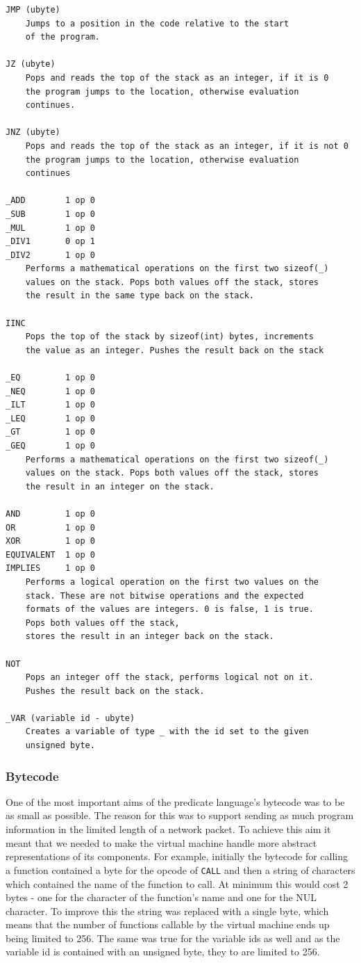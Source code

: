 \begin{verbatim}
JMP (ubyte)
    Jumps to a position in the code relative to the start
    of the program.

JZ (ubyte)
    Pops and reads the top of the stack as an integer, if it is 0
    the program jumps to the location, otherwise evaluation
    continues.

JNZ (ubyte)
    Pops and reads the top of the stack as an integer, if it is not 0
    the program jumps to the location, otherwise evaluation
    continues

_ADD        1 op 0
_SUB        1 op 0
_MUL        1 op 0
_DIV1       0 op 1
_DIV2       1 op 0
    Performs a mathematical operations on the first two sizeof(_)
    values on the stack. Pops both values off the stack, stores
    the result in the same type back on the stack.

IINC
    Pops the top of the stack by sizeof(int) bytes, increments
    the value as an integer. Pushes the result back on the stack

_EQ	        1 op 0
_NEQ        1 op 0
_ILT        1 op 0
_LEQ        1 op 0
_GT	        1 op 0
_GEQ        1 op 0
    Performs a mathematical operations on the first two sizeof(_)
    values on the stack. Pops both values off the stack, stores
    the result in an integer on the stack.

AND         1 op 0
OR          1 op 0
XOR	        1 op 0
EQUIVALENT  1 op 0
IMPLIES     1 op 0
    Performs a logical operation on the first two values on the
    stack. These are not bitwise operations and the expected
    formats of the values are integers. 0 is false, 1 is true.
    Pops both values off the stack,
    stores the result in an integer back on the stack.

NOT
    Pops an integer off the stack, performs logical not on it.
    Pushes the result back on the stack.
	
_VAR (variable id - ubyte)
    Creates a variable of type _ with the id set to the given
    unsigned byte.
\end{verbatim}


\subsubsection{Bytecode}

One of the most important aims of the predicate language's bytecode was to be as small as possible. The reason for this was to support sending as much program information in the limited length of a network packet. To achieve this aim it meant that we needed to make the virtual machine handle more abstract representations of its components. For example, initially the bytecode for calling a function contained a byte for the opcode of \verb|CALL| and then a string of characters which contained the name of the function to call. At minimum this would cost 2 bytes - one for the character of the function's name and one for the NUL character. To improve this the string was replaced with a single byte, which means that the number of functions callable by the virtual machine ends up being limited to 256. The same was true for the variable ids as well and as the variable id is contained with an unsigned byte, they to are limited to 256.


